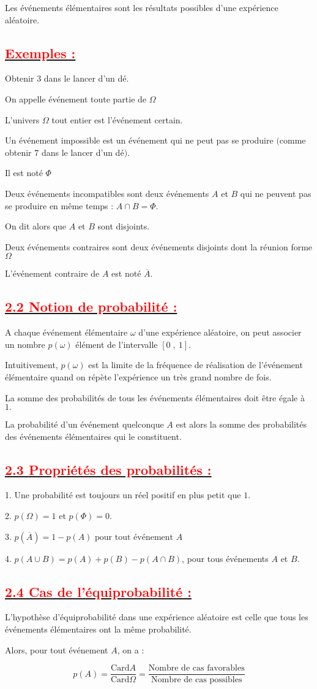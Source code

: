 \documentclass[12pt]{article}
\begin{document}
Les événements élémentaires sont les résultats possibles d'une expérience aléatoire.
\subsection*{\underline{\textbf{\textcolor{red}{Exemples :}}}}
Obtenir $3$ dans le lancer d'un dé.

On appelle événement toute partie de $\Omega$

L'univers $\Omega$ tout entier est l'événement certain.

Un événement impossible est un événement qui ne peut pas se produire $($comme obtenir $7$ dans le lancer d'un dé$).$

Il est noté $\Phi$

Deux événements incompatibles sont deux événements $A$ et $B$ qui ne peuvent pas se produire en même temps : $A\cap B=\Phi.$

On dit alors que $A$ et $B$ sont disjoints.

Deux événements contraires sont deux événements disjoints dont la réunion forme $\Omega$

L'événement contraire de $A$ est noté $\overline{A}.$
\subsection*{\underline{\textbf{\textcolor{red}{2.2 Notion de probabilité :}}}}
A chaque événement élémentaire $\omega$ d'une expérience aléatoire, on peut associer un nombre $p(\omega)$ élément de l'intervalle $[0\;,\ 1].$

Intuitivement, $p(\omega)$ est la limite de la fréquence de réalisation de l'événement élémentaire  quand on répète l'expérience un très grand nombre de fois.

La somme des probabilités de tous les événements élémentaires doit être égale à $1.$

La probabilité d'un événement quelconque $A$ est alors la somme des probabilités des événements élémentaires qui le constituent.
\subsection*{\underline{\textbf{\textcolor{red}{2.3 Propriétés des probabilités :}}}}
1. Une probabilité est toujours un réel positif en plus petit que $1.$

2. $p(\Omega)=1$ et $p(\Phi)=0.$

3. $p(\overline{A})=1-p(A)\text{ pour tout événement }A$

4. $p(A\cup B)=p(A)+p(B)-p(A\cap B)$, pour tous événements $A$ et $B.$
\subsection*{\underline{\textbf{\textcolor{red}{2.4 Cas de l'équiprobabilité :}}}}
L'hypothèse d'équiprobabilité dans une expérience aléatoire est celle que tous les événements élémentaires ont la même probabilité.

Alors, pour tout événement $A$, on a :

$$p(A)=\dfrac{\text{Card}A}{\text{Card}\Omega}=\dfrac{\text{Nombre de cas favorables}}{\text{Nombre de cas possibles}}$$
\end{document}

